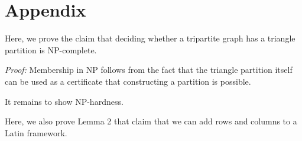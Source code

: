 \documentclass[11pt]{article}
\begin{document}
\section{Appendix}

Here, we prove the claim that deciding whether a tripartite graph has a triangle partition is NP-complete.

\emph{Proof: } Membership in NP follows from the fact that the triangle partition itself can be used as a certificate that constructing a partition is possible.

It remains to show NP-hardness. 

Here, we also prove Lemma 2 that claim that we can add rows and columns to a Latin framework.
\end{document}
